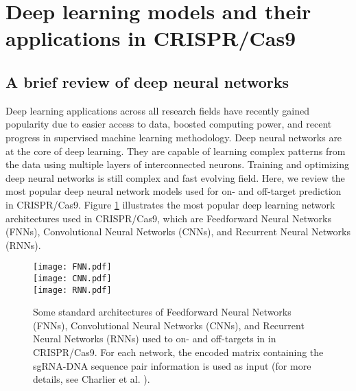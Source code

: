 \documentclass[unnumsec,webpdf,contemporary,large]{oup-authoring-template}
\theoremstyle{thmstyleone}%
\theoremstyle{thmstyletwo}%
\theoremstyle{thmstylethree}%
\begin{document}

\section{Deep learning models and their applications in CRISPR/Cas9}
\subsection{\textbf{A brief review of deep neural networks}}
Deep learning applications across all research fields have recently gained popularity due to easier access to data, boosted computing power, and recent progress in supervised machine learning methodology. Deep neural networks are at the core of deep learning. They are capable of learning complex patterns from the data using multiple layers of interconnected neurons. Training and optimizing deep neural networks is still complex and fast evolving field. Here, we review the most popular deep neural network models used for on- and off-target prediction in CRISPR/Cas9. Figure \ref{fig:2} illustrates the most popular deep learning network architectures used in CRISPR/Cas9, which are Feedforward Neural Networks (FNNs), Convolutional Neural Networks (CNNs), and Recurrent Neural Networks (RNNs).

\begin{figure}
  \centering
  \texttt{[image: FNN.pdf]}\vspace{-6em}\\
  \centering
  \texttt{[image: CNN.pdf]}\vspace{-7em}\\
  \centering
  \texttt{[image: RNN.pdf]}\vspace{-4em}
  \caption{Some standard architectures of Feedforward Neural Networks (FNNs), Convolutional Neural Networks (CNNs), and Recurrent Neural Networks (RNNs) used to on- and off-targets in in CRISPR/Cas9. For each network, the encoded matrix containing the sgRNA-DNA sequence pair information is used as input (for more details, see Charlier et al. \citep{charlier2021accurate}).}
  \label{fig:2}
\end{figure}
\end{document}

